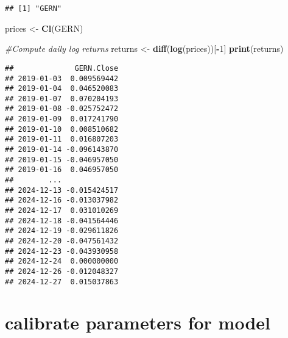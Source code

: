 \documentclass[
]{article}
\newenvironment{Shaded}{\begin{snugshade}}{\end{snugshade}}
\newcommand{\CommentTok}[1]{\textcolor[rgb]{0.56,0.35,0.01}{\textit{#1}}}
\newcommand{\DecValTok}[1]{\textcolor[rgb]{0.00,0.00,0.81}{#1}}
\newcommand{\FunctionTok}[1]{\textcolor[rgb]{0.13,0.29,0.53}{\textbf{#1}}}
\newcommand{\NormalTok}[1]{#1}
\newcommand{\OtherTok}[1]{\textcolor[rgb]{0.56,0.35,0.01}{#1}}
\newcommand{\SpecialCharTok}[1]{\textcolor[rgb]{0.81,0.36,0.00}{\textbf{#1}}}
\begin{document}
\begin{verbatim}
## [1] "GERN"
\end{verbatim}

\begin{Shaded}
\begin{Highlighting}[]
\NormalTok{prices }\OtherTok{\textless{}{-}} \FunctionTok{Cl}\NormalTok{(GERN)}

\CommentTok{\#Compute daily log returns}
\NormalTok{returns }\OtherTok{\textless{}{-}} \FunctionTok{diff}\NormalTok{(}\FunctionTok{log}\NormalTok{(prices))[}\SpecialCharTok{{-}}\DecValTok{1}\NormalTok{]  }
\FunctionTok{print}\NormalTok{(returns)}
\end{Highlighting}
\end{Shaded}

\begin{verbatim}
##              GERN.Close
## 2019-01-03  0.009569442
## 2019-01-04  0.046520083
## 2019-01-07  0.070204193
## 2019-01-08 -0.025752472
## 2019-01-09  0.017241790
## 2019-01-10  0.008510682
## 2019-01-11  0.016807203
## 2019-01-14 -0.096143870
## 2019-01-15 -0.046957050
## 2019-01-16  0.046957050
##        ...             
## 2024-12-13 -0.015424517
## 2024-12-16 -0.013037982
## 2024-12-17  0.031010269
## 2024-12-18 -0.041564446
## 2024-12-19 -0.029611826
## 2024-12-20 -0.047561432
## 2024-12-23 -0.043930958
## 2024-12-24  0.000000000
## 2024-12-26 -0.012048327
## 2024-12-27  0.015037863
\end{verbatim}

\section{calibrate parameters for
model}\label{calibrate-parameters-for-model}
\end{document}
